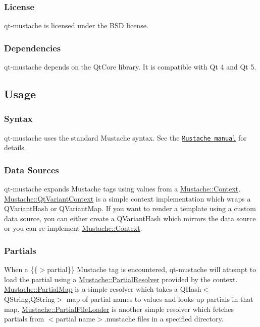 \subsubsection*{License}

qt-\/mustache is licensed under the B\-S\-D license.

\subsubsection*{Dependencies}

qt-\/mustache depends on the Qt\-Core library. It is compatible with Qt 4 and Qt 5.

\subsection*{Usage}

\subsubsection*{Syntax}

qt-\/mustache uses the standard Mustache syntax. See the \href{http://mustache.github.com/mustache.5.html}{\tt Mustache manual} for details.

\subsubsection*{Data Sources}

qt-\/mustache expands Mustache tags using values from a {\ttfamily \hyperlink{classMustache_1_1Context}{Mustache\-::\-Context}}. {\ttfamily \hyperlink{classMustache_1_1QtVariantContext}{Mustache\-::\-Qt\-Variant\-Context}} is a simple context implementation which wraps a {\ttfamily Q\-Variant\-Hash} or {\ttfamily Q\-Variant\-Map}. If you want to render a template using a custom data source, you can either create a {\ttfamily Q\-Variant\-Hash} which mirrors the data source or you can re-\/implement {\ttfamily \hyperlink{classMustache_1_1Context}{Mustache\-::\-Context}}.

\subsubsection*{Partials}

When a {\ttfamily \{\{$>$partial\}\}} Mustache tag is encountered, qt-\/mustache will attempt to load the partial using a {\ttfamily \hyperlink{classMustache_1_1PartialResolver}{Mustache\-::\-Partial\-Resolver}} provided by the context. {\ttfamily \hyperlink{classMustache_1_1PartialMap}{Mustache\-::\-Partial\-Map}} is a simple resolver which takes a {\ttfamily Q\-Hash$<$Q\-String,Q\-String$>$} map of partial names to values and looks up partials in that map. {\ttfamily \hyperlink{classMustache_1_1PartialFileLoader}{Mustache\-::\-Partial\-File\-Loader}} is another simple resolver which fetches partials from {\ttfamily $<$partial name$>$.mustache} files in a specified directory.


